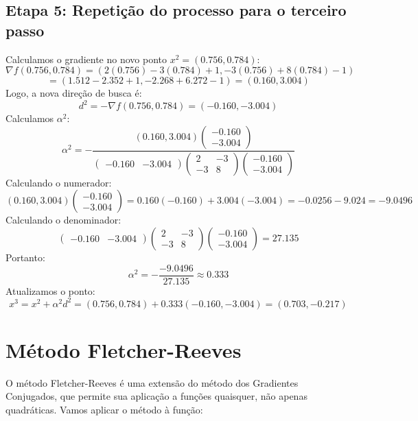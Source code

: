 \documentclass[a4paper, 12pt]{article}
\begin{document}
\subsection{Etapa 5: Repetição do processo para o terceiro passo}

Calculamos o gradiente no novo ponto \( x^2 = (0.756, 0.784) \):
\[
\nabla f(0.756, 0.784) = (2(0.756) - 3(0.784) + 1, -3(0.756) + 8(0.784) - 1)
\]
\[
= (1.512 - 2.352 + 1, -2.268 + 6.272 - 1) = (0.160, 3.004)
\]
Logo, a nova direção de busca é:
\[
d^2 = -\nabla f(0.756, 0.784) = (-0.160, -3.004)
\]
Calculamos \( \alpha^2 \):
\[
\alpha^2 = -\frac{(0.160, 3.004) \begin{pmatrix} -0.160 \\ -3.004 \end{pmatrix}}{\begin{pmatrix} -0.160 & -3.004 \end{pmatrix} \begin{pmatrix} 2 & -3 \\ -3 & 8 \end{pmatrix} \begin{pmatrix} -0.160 \\ -3.004 \end{pmatrix}}
\]
Calculando o numerador:
\[
(0.160, 3.004) \begin{pmatrix} -0.160 \\ -3.004 \end{pmatrix} = 0.160(-0.160) + 3.004(-3.004) = -0.0256 - 9.024 = -9.0496
\]
Calculando o denominador:
\[
\begin{pmatrix} -0.160 & -3.004 \end{pmatrix} \begin{pmatrix} 2 & -3 \\ -3 & 8 \end{pmatrix} \begin{pmatrix} -0.160 \\ -3.004 \end{pmatrix} = 27.135
\]
Portanto:
\[
\alpha^2 = -\frac{-9.0496}{27.135} \approx 0.333
\]
Atualizamos o ponto:
\[
x^3 = x^2 + \alpha^2 d^2 = (0.756, 0.784) + 0.333(-0.160, -3.004) = (0.703, -0.217)
\]

\section{Método Fletcher-Reeves}
O método Fletcher-Reeves é uma extensão do método dos Gradientes Conjugados, que permite sua aplicação a funções quaisquer, não apenas quadráticas. Vamos aplicar o método à função:
\end{document}
